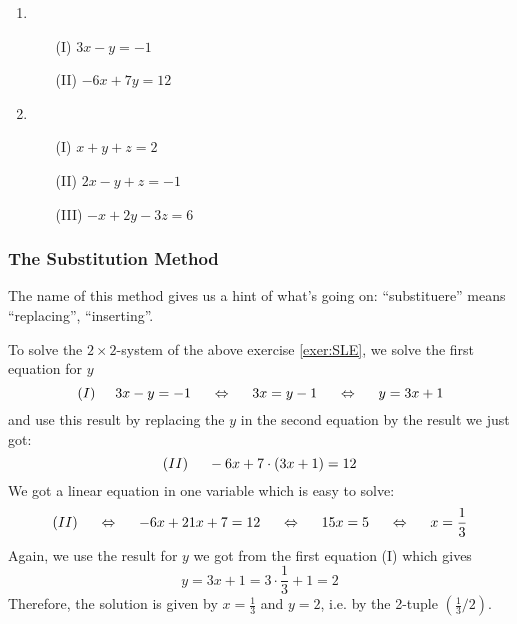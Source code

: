 \begin{exer}\label{exer:SLE}
$ $

\vsp

\begin{enumerate}[label=\emph{\alph*})]

\item 
\begin{itemize}
\item[(I)] $3x-y =-1$
\item[(II)] $-6x+7y=12$
\end{itemize}
\vfill

\item 
\begin{itemize}
\item[(I)] $x+y+z=2$
\item[(II)] $2x-y+z=-1$
\item[(III)] $-x+2y-3z=6$
\end{itemize}

\end{enumerate}
\vfill
\end{exer}




\newpage

\subsubsection{The Substitution Method}

The name of this method gives us a hint of what's going on: ``substituere'' means ``replacing'', ``inserting''.  
\vsp

\begin{example}
To solve the $2\times 2$-system of the above exercise \ref{exer:SLE}, we solve the first equation for $y$
\[
(I) \hspace{5mm} 3x-y=-1 \hspace{5mm} \Leftrightarrow \hspace{5mm} 3x=y-1 \hspace{5mm}\Leftrightarrow \hspace{5mm} y=3x+1
\]
and use this result by replacing the $y$ in the second equation by the result we just got:
\[
(II) \hspace{5mm}  -6x+7\cdot (3x+1) =12
\]
We got a linear equation in one variable which is easy to solve:
\[
(II) \hspace{5mm}\Leftrightarrow\hspace{5mm} -6x+21x+7=12 \hspace{5mm}\Leftrightarrow\hspace{5mm} 15x=5 \hspace{5mm}\Leftrightarrow\hspace{5mm} x=\frac13
\]
Again, we use the result for $y$ we got from the first equation (I) which gives 
\[
y=3x+1=3\cdot \frac 13+1 = 2
\]
Therefore, the solution is given by $x=\frac{1}{3}$ and $y=2$, i.e. by the 2-tuple $(\frac13/ 2)$.
\end{example}
\vsp\vsp

